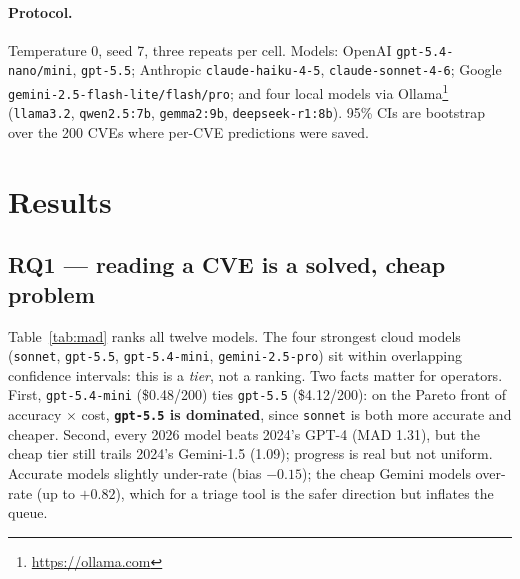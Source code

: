 \documentclass[10pt,twocolumn]{article}
\newcommand{\code}[1]{\texttt{\small #1}}
\begin{document}
\paragraph{Protocol.} Temperature 0, seed 7, three repeats per cell. Models:
OpenAI \code{gpt-5.4-nano/mini}, \code{gpt-5.5}; Anthropic
\code{claude-haiku-4-5}, \code{claude-sonnet-4-6}; Google
\code{gemini-2.5-flash-lite/flash/pro}; and four local models via
Ollama\footnote{\url{https://ollama.com}} (\code{llama3.2}, \code{qwen2.5:7b},
\code{gemma2:9b}, \code{deepseek-r1:8b}). 95\% CIs are bootstrap over the 200
CVEs where per-CVE predictions were saved.

\section{Results}

\subsection{RQ1 --- reading a CVE is a solved, cheap problem}
Table~\ref{tab:mad} ranks all twelve models. The four strongest cloud models
(\code{sonnet}, \code{gpt-5.5}, \code{gpt-5.4-mini}, \code{gemini-2.5-pro}) sit
within overlapping confidence intervals: this is a \emph{tier}, not a ranking.
Two facts matter for operators. First, \code{gpt-5.4-mini} (\$0.48/200) ties
\code{gpt-5.5} (\$4.12/200): on the Pareto front of accuracy $\times$ cost,
\textbf{\code{gpt-5.5} is dominated}, since \code{sonnet} is both more accurate and
cheaper. Second, every 2026 model beats 2024's GPT-4 (MAD 1.31), but the cheap
tier still trails 2024's Gemini-1.5 (1.09); progress is real but not uniform.
Accurate models slightly under-rate (bias $-0.15$); the cheap Gemini models
over-rate (up to $+0.82$), which for a triage tool is the safer direction but
inflates the queue.
\end{document}
